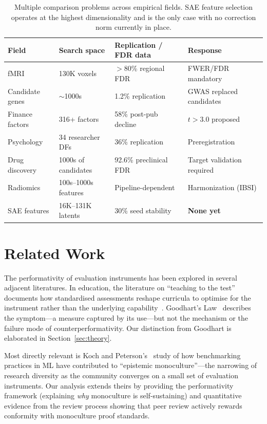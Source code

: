 \documentclass{article}
\begin{document}
\begin{table}[t]
\centering
\caption{Multiple comparison problems across empirical fields. SAE feature selection operates at the highest dimensionality and is the only case with no correction norm currently in place.}
\label{tab:cross_field}
\small
\begin{tabular}{@{}llll@{}}
\toprule
\textbf{Field} & \textbf{Search space} & \textbf{Replication / FDR data} & \textbf{Response} \\
\midrule
fMRI & 130K voxels & ${>}$80\% regional FDR & FWER/FDR mandatory~\citep{bennett_dead_salmon_2010} \\
Candidate genes & $\sim$1000s & 1.2\% replication & GWAS replaced candidates~\citep{ioannidis_candidate_genes_2001} \\
Finance factors & 316+ factors & 58\% post-pub decline & $t > 3.0$ proposed~\citep{harvey_factor_zoo_2016} \\
Psychology & 34 researcher DFs & 36\% replication & Preregistration~\citep{nosek_replication_2015} \\
Drug discovery & 1000s of candidates & 92.6\% preclinical FDR & Target validation required \\
Radiomics & 100s--1000s features & Pipeline-dependent & Harmonization (IBSI) \\
SAE features & 16K--131K latents & 30\% seed stability & \textbf{None yet} \\
\bottomrule
\end{tabular}
\end{table}

\section{Related Work}
\label{sec:related}

The performativity of evaluation instruments has been explored in several adjacent literatures. In education, the literature on ``teaching to the test'' documents how standardised assessments reshape curricula to optimise for the instrument rather than the underlying capability~\citep{au_high_2007}. Goodhart's Law~\citep{goodhart_1975} describes the symptom---a measure captured by its use---but not the mechanism or the failure mode of counterperformativity. Our distinction from Goodhart is elaborated in Section~\ref{sec:theory}.

Most directly relevant is Koch and Peterson's~\citep{koch_peterson_2024} study of how benchmarking practices in ML have contributed to ``epistemic monoculture''---the narrowing of research diversity as the community converges on a small set of evaluation instruments. Our analysis extends theirs by providing the performativity framework (explaining \textit{why} monoculture is self-sustaining) and quantitative evidence from the review process showing that peer review actively rewards conformity with monoculture proof standards.
\end{document}
